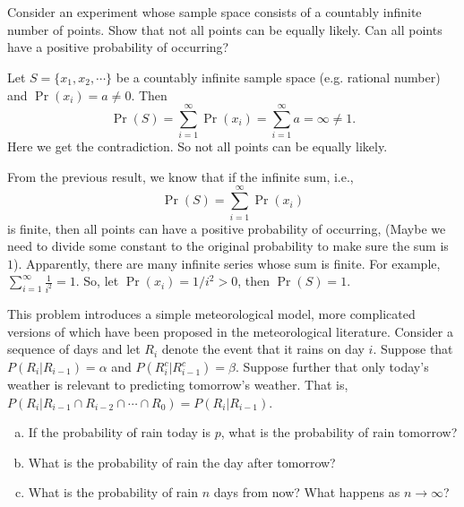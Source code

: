 \documentclass[14pt]{elegantbook}
\begin{document}

\setcounter{chapter}{1}
\chapter{}

    \begin{exercise*}[1]
        Consider an experiment whose sample space consists of a countably infinite number of points. Show that not all points can be equally likely. Can all points have a positive probability of occurring? 
    \end{exercise*}

    \begin{solution}
        Let $S=\{x_1, x_2, \cdots\}$ be a countably infinite sample space (e.g. rational number) and $\Pr(x_i)=a\neq0$. Then 
        \[\Pr(S)=\sum_{i=1}^\infty\Pr(x_i)=\sum_{i=1}^\infty a=\infty\neq 1.\]
        Here we get the contradiction. So not all points can be equally likely. 

        From the previous result, we know that if the infinite sum, i.e., 
        \[\Pr(S)=\sum_{i=1}^\infty \Pr(x_i)\] 
        is finite, then all points can have a positive probability of occurring, (Maybe we need to divide some constant to the original probability to make sure the sum is $1$). Apparently, there are many infinite series whose sum is finite. For example, $\sum_{i=1}^\infty \frac{1}{i^2}=1$. So, let $\Pr(x_i)=1/i^2>0$, then $\Pr(S)=1$. 
    \end{solution}

    \begin{exercise*}[2]
        This problem introduces a simple meteorological model, more complicated versions of which have been proposed in the meteorological literature. Consider a sequence of days and let $R_i$ denote the event that it rains on day $i$. Suppose that $P(R_i|R_{i-1})=\alpha$ and $P(R_i^c|R_{i-1}^c)=\beta$. Suppose further that only today's weather is relevant to predicting tomorrow's weather. That is, $P(R_i|R_{i-1}\cap R_{i-2}\cap \cdots\cap R_0)=P(R_i|R_{i-1})$. 
        \begin{enumerate}[(a)]
            \item If the probability of rain today is $p$, what is the probability of rain tomorrow?
            \item What is the probability of rain the day after tomorrow? 
            \item What is the probability of rain $n$ days from now? What happens as $n\to\infty$? 
        \end{enumerate}
    \end{exercise*}
\end{document}
